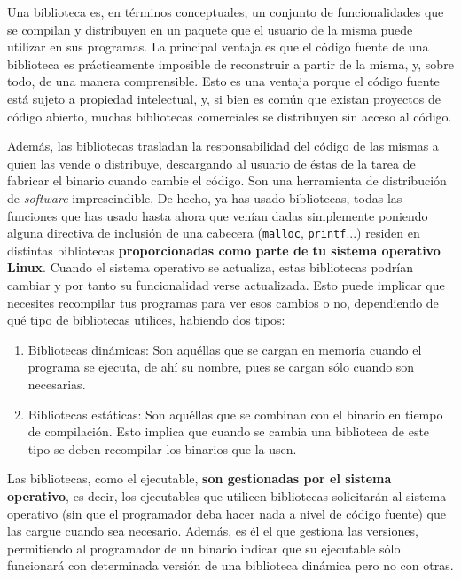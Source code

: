 \documentclass[a4paper]{article}
\begin{document}
Una biblioteca es, en términos conceptuales, un conjunto de funcionalidades que
se compilan y distribuyen en un paquete que el usuario de la misma puede
utilizar en sus programas. La principal ventaja es que el código fuente de una
biblioteca es prácticamente imposible de reconstruir a partir de la misma, y,
sobre todo, de una manera comprensible. Esto es una ventaja porque el código
fuente está sujeto a propiedad intelectual, y, si bien es común que existan
proyectos de código abierto, muchas bibliotecas comerciales se distribuyen sin
acceso al código.

Además, las bibliotecas trasladan la responsabilidad del código de las mismas
a quien las vende o distribuye, descargando al usuario de éstas de la tarea
de fabricar
el binario cuando cambie el código. Son una herramienta de distribución de
\emph{software} imprescindible. De hecho, ya has usado bibliotecas, todas las
funciones que has usado hasta ahora que venían dadas simplemente poniendo
alguna directiva de inclusión de una cabecera (\verb!malloc!, \verb!printf!...)
residen en distintas bibliotecas \textbf{proporcionadas como parte de tu
sistema operativo Linux}. Cuando el sistema operativo se actualiza, estas
bibliotecas podrían cambiar y por tanto su funcionalidad verse actualizada.
Esto puede implicar que necesites recompilar tus programas para ver esos cambios
o no, dependiendo de qué tipo de bibliotecas utilices, habiendo dos tipos:

\begin{enumerate}
\item Bibliotecas dinámicas: Son aquéllas que se cargan en memoria cuando el
programa se ejecuta, de ahí su nombre, pues se cargan sólo cuando son
necesarias.
\item Bibliotecas estáticas: Son aquéllas que se combinan con el binario en
tiempo de compilación. Esto implica que cuando se cambia una biblioteca de este
tipo se deben recompilar los binarios que la usen.
\end{enumerate}

Las bibliotecas, como el ejecutable, \textbf{son gestionadas por el sistema
operativo}, es decir, los ejecutables que utilicen bibliotecas solicitarán al
sistema operativo (sin que el programador deba hacer nada a nivel de código
fuente) que las cargue cuando sea necesario. Además, es él el que gestiona
las versiones, permitiendo al programador de un binario indicar que su
ejecutable sólo funcionará con determinada versión de una biblioteca dinámica
pero no con otras.
\end{document}
